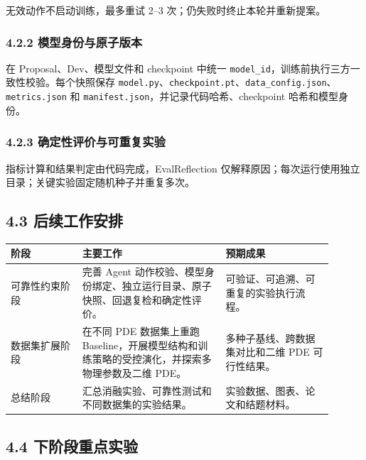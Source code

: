 \documentclass[UTF8,a4paper,zihao=-4]{ctexart}
\begin{document}
无效动作不启动训练，最多重试 2--3 次；仍失败时终止本轮并重新提案。

\subsubsection*{4.2.2 模型身份与原子版本}

在 Proposal、Dev、模型文件和 checkpoint 中统一 \texttt{model\_id}，训练前执行三方一致性校验。每个快照保存 \texttt{model.py}、\texttt{checkpoint.pt}、\texttt{data\_config.json}、\texttt{metrics.json} 和 \texttt{manifest.json}，并记录代码哈希、checkpoint 哈希和模型身份。

\subsubsection*{4.2.3 确定性评价与可重复实验}

指标计算和结果判定由代码完成，EvalReflection 仅解释原因；每次运行使用独立目录；关键实验固定随机种子并重复多次。

\subsection*{4.3 后续工作安排}

\begin{longtable}{|>{\raggedright\arraybackslash}p{0.2\linewidth}|>{\raggedright\arraybackslash}p{0.4\linewidth}|>{\raggedright\arraybackslash}p{0.3\linewidth}|}
\hline
\textbf{阶段} & \textbf{主要工作} & \textbf{预期成果} \\
\hline
可靠性约束阶段 & 完善 Agent 动作校验、模型身份绑定、独立运行目录、原子快照、回退复检和确定性评价。 & 可验证、可追溯、可重复的实验执行流程。 \\
\hline
数据集扩展阶段 & 在不同 PDE 数据集上重跑 Baseline，开展模型结构和训练策略的受控演化，并探索多物理参数及二维 PDE。 & 多种子基线、跨数据集对比和二维 PDE 可行性结果。 \\
\hline
总结阶段 & 汇总消融实验、可靠性测试和不同数据集的实验结果。 & 实验数据、图表、论文和结题材料。 \\
\hline
\end{longtable}

\subsection*{4.4 下阶段重点实验}
\end{document}
